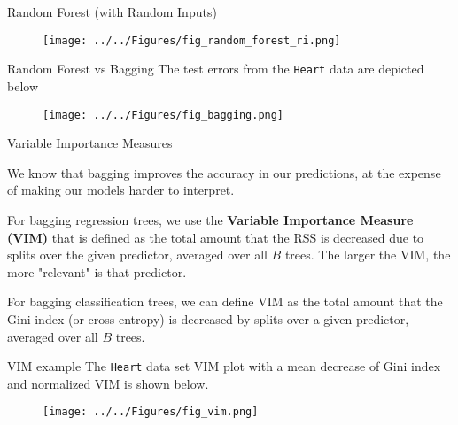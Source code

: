 \documentclass{beamer}
\begin{document}
\begin{frame}{Random Forest (with Random Inputs)}
			 \begin{figure}[h]
		\centering
		\texttt{[image: ../../Figures/fig\_random\_forest\_ri.png]}
	\end{figure}
	

\end{frame}


\begin{frame}{Random Forest vs Bagging}
	The test errors from the {\tt Heart} data are depicted below
	 \begin{figure}[h]
		\centering
		\texttt{[image: ../../Figures/fig\_bagging.png]}
	\end{figure}
\end{frame}

\begin{frame}{Variable Importance Measures}
	
	We know that bagging improves the accuracy in our predictions, at the expense of making our models harder to interpret. 
	
	For bagging regression trees, we use the {\bf Variable Importance Measure (VIM)} that is defined as the total amount that the RSS is decreased due to splits over the given predictor, averaged over all $B$ trees.  The larger the VIM, the more "relevant" is that predictor.
	
	For bagging classification trees, we can define VIM as the total amount that the Gini index (or cross-entropy) is decreased by splits over a given predictor, averaged over all $B$ trees. 
\end{frame}

\begin{frame}{VIM example}
	The {\tt Heart} data set VIM plot with a mean decrease of Gini index and normalized VIM is shown below.
	\begin{figure}[h]
		\centering
		\texttt{[image: ../../Figures/fig\_vim.png]}
	\end{figure}
	
\end{frame}
\end{document}
